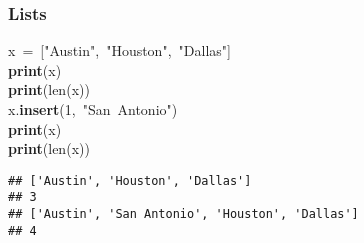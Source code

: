 \documentclass{beamer}\usepackage[]{graphicx}\usepackage[]{color}
\makeatletter
\newcommand{\hlnum}[1]{\textcolor[rgb]{0.686,0.059,0.569}{#1}}%
\newcommand{\hlstr}[1]{\textcolor[rgb]{0.192,0.494,0.8}{#1}}%
\newcommand{\hlopt}[1]{\textcolor[rgb]{0,0,0}{#1}}%
\newcommand{\hlstd}[1]{\textcolor[rgb]{0.345,0.345,0.345}{#1}}%
\newcommand{\hlkwa}[1]{\textcolor[rgb]{0.161,0.373,0.58}{\textbf{#1}}}%
\newcommand{\hlkwb}[1]{\textcolor[rgb]{0.69,0.353,0.396}{#1}}%
\newcommand{\hlkwd}[1]{\textcolor[rgb]{0.737,0.353,0.396}{\textbf{#1}}}%
\newenvironment{kframe}{%
 \def\at@end@of@kframe{}%
 \ifinner\ifhmode%
  \def\at@end@of@kframe{\end{minipage}}%
  \begin{minipage}{\columnwidth}%
 \fi\fi%
 \def\FrameCommand##1{\hskip\@totalleftmargin \hskip-\fboxsep
 \colorbox{shadecolor}{##1}\hskip-\fboxsep
     \hskip-\linewidth \hskip-\@totalleftmargin \hskip\columnwidth}%
 \MakeFramed {\advance\hsize-\width
   \@totalleftmargin\z@ \linewidth\hsize
   \@setminipage}}%
 {\par\unskip\endMakeFramed%
 \at@end@of@kframe}
\newenvironment{knitrout}{}{} %
\makeatother
\begin{document}
\begin{frame}[fragile]
\frametitle{Lists}
\begin{knitrout}
\color{fgcolor}\begin{kframe}
\noindent
\ttfamily
\hlstd{x\ }\hlopt{=\ {[}}\hlstd{}\hlstr{"Austin"}\hlstd{}\hlopt{,\ }\hlstd{}\hlstr{"Houston"}\hlstd{}\hlopt{,\ }\hlstd{}\hlstr{"Dallas"}\hlstd{}\hlopt{{]}}\hspace*{\fill}\\
\hlstd{}\hlkwa{print}\hlstd{}\hlopt{(}\hlstd{x}\hlopt{)}\hspace*{\fill}\\
\hlstd{}\hlkwa{print}\hlstd{}\hlopt{(}\hlstd{}\hlkwb{len}\hlstd{}\hlopt{(}\hlstd{x}\hlopt{))}\hspace*{\fill}\\
\hlstd{x}\hlopt{.}\hlstd{}\hlkwd{insert}\hlstd{}\hlopt{(}\hlstd{}\hlnum{1}\hlstd{}\hlopt{,\ }\hlstd{}\hlstr{"San\ Antonio"}\hlstd{}\hlopt{)}\hspace*{\fill}\\
\hlstd{}\hlkwa{print}\hlstd{}\hlopt{(}\hlstd{x}\hlopt{)}\hspace*{\fill}\\
\hlstd{}\hlkwa{print}\hlstd{}\hlopt{(}\hlstd{}\hlkwb{len}\hlstd{}\hlopt{(}\hlstd{x}\hlopt{))}\hlstd{}\hspace*{\fill}
\mbox{}
\normalfont

\begin{verbatim}
## ['Austin', 'Houston', 'Dallas']
## 3
## ['Austin', 'San Antonio', 'Houston', 'Dallas']
## 4
\end{verbatim}
\end{kframe}
\end{knitrout}
\end{frame}
\end{document}
